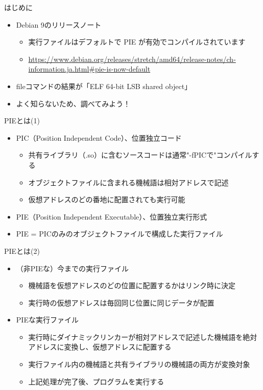 
\begin{frame}[containsverbatim]{はじめに}
  \begin{itemize}
  \item Debian 9のリリースノート
    \begin{itemize}
    \item 実行ファイルはデフォルトで PIE が有効でコンパイルされています
    \item \url{https://www.debian.org/releases/stretch/amd64/release-notes/ch-information.ja.html\#pie-is-now-default}
    \end{itemize}
  \item fileコマンドの結果が「ELF 64-bit LSB shared object」
  \item よく知らないため、調べてみよう！
  \end{itemize}
\end{frame}



\begin{frame}[containsverbatim]{PIEとは(1)}
  \begin{itemize}
  \item PIC（Position Independent Code）、位置独立コード
    \begin{itemize}
    \item 共有ライブラリ（.so）に含むソースコードは通常"-fPICで"コンパイルする
    \item オブジェクトファイルに含まれる機械語は相対アドレスで記述
    \item 仮想アドレスのどの番地に配置されても実行可能
    \end{itemize}
  \item PIE（Position Independent Executable）、位置独立実行形式
  \item PIE = PICのみのオブジェクトファイルで構成した実行ファイル
  \end{itemize}
\end{frame}

\begin{frame}[containsverbatim]{PIEとは(2)}
  \begin{itemize}
  \item （非PIEな）今までの実行ファイル
    \begin{itemize}
    \item 機械語を仮想アドレスのどの位置に配置するかはリンク時に決定
    \item 実行時の仮想アドレスは毎回同じ位置に同じデータが配置
    \end{itemize}
  \item PIEな実行ファイル
    \begin{itemize}
    \item 実行時にダイナミックリンカーが相対アドレスで記述した機械語を絶対アドレスに変換し、仮想アドレスに配置する
    \item 実行ファイル内の機械語と共有ライブラリの機械語の両方が変換対象
    \item 上記処理が完了後、プログラムを実行する
    \end{itemize}
  \end{itemize}
\end{frame}


